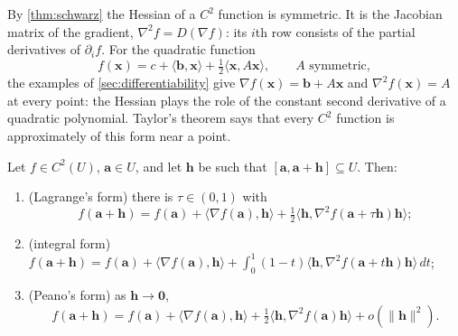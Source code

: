 By \cref{thm:schwarz} the Hessian of a $C^2$ function is symmetric. It is the Jacobian matrix of the gradient, $\nabla^2f=D(\nabla f)$: its $i$th row consists of the partial derivatives of $\partial_if$. For the quadratic function
\[
f(\mathbf x)=c+\langle\mathbf b,\mathbf x\rangle+\tfrac12\langle\mathbf x,A\mathbf x\rangle,\qquad A\text{ symmetric},
\]
the examples of \cref{sec:differentiability} give $\nabla f(\mathbf x)=\mathbf b+A\mathbf x$ and $\nabla^2f(\mathbf x)=A$ at every point: the Hessian plays the role of the constant second derivative of a quadratic polynomial. Taylor's theorem says that every $C^2$ function is approximately of this form near a point.

\begin{theorem}
\label{thm:taylor-rn}
Let $f\in C^2(U)$, $\mathbf a\in U$, and let $\mathbf h$ be such that $[\mathbf a,\mathbf a+\mathbf h]\subseteq U$. Then:
\begin{enumerate}
\item (Lagrange's form) there is $\tau\in(0,1)$ with
\[
f(\mathbf a+\mathbf h)=f(\mathbf a)+\langle\nabla f(\mathbf a),\mathbf h\rangle+\tfrac12\bigl\langle\mathbf h,\nabla^2f(\mathbf a+\tau\mathbf h)\mathbf h\bigr\rangle ;
\]
\item (integral form) $f(\mathbf a+\mathbf h)=f(\mathbf a)+\langle\nabla f(\mathbf a),\mathbf h\rangle+\int_0^1(1-t)\bigl\langle\mathbf h,\nabla^2f(\mathbf a+t\mathbf h)\mathbf h\bigr\rangle\,dt$;
\item (Peano's form) as $\mathbf h\to\mathbf0$,
\[
f(\mathbf a+\mathbf h)=f(\mathbf a)+\langle\nabla f(\mathbf a),\mathbf h\rangle+\tfrac12\langle\mathbf h,\nabla^2f(\mathbf a)\mathbf h\rangle+o(\|\mathbf h\|^2).
\]
\end{enumerate}
\end{theorem}

